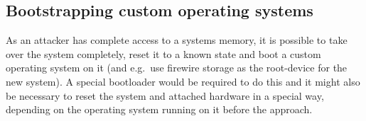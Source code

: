\subsection{Bootstrapping custom operating systems}

As an attacker has complete access to a systems memory, it is possible to take
over the system completely, reset it to a known state and boot a custom
operating system on it (and e.g.~use firewire storage as the root-device for the
new system). A special bootloader would be required to do this and it might also
be necessary to reset the system and attached hardware in a special way,
depending on the operating system running on it before the approach.

